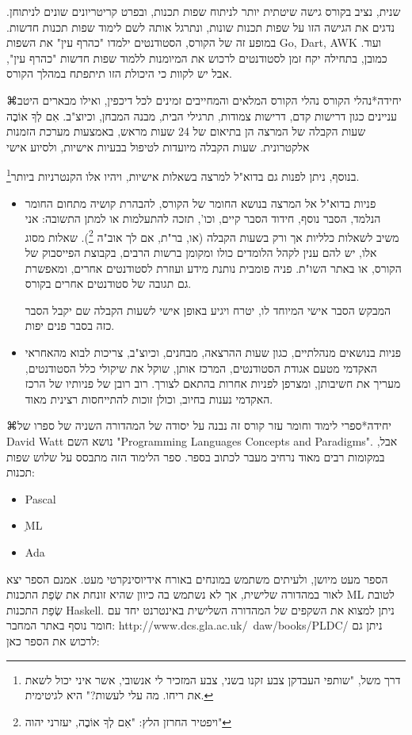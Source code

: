 שנית, נציב בקורס גישה שיטתית יותר לניתוח שפות תכנות, ובפרט קריטריונים שונים
לניתוחן. נדגים את הגישה הזו על שפות תכנות שונות, ונתרגל אותה לשם לימוד שפות
תכנות חדשות. במופע זה של הקורס, הסטודנטים ילמדו "כהרף עין" את השפות Go, Dart,
AWK ועוד. כמובן, בתחילה יקח זמן לסטודנטים לרכוש את המיומנות ללמוד שפות חדשות
"כהרף עין", אבל יש לקוות כי היכולת הזו תיתפתח במהלך הקורס. 


⌘יחידה*{נהלי הקורס} 
      נהלי הקורס המלאים והמחייבים זמינים לכל דיכפין, ואילו מבארים היטב עניינים כגון דרישות קדם, דרישות צמודות, תרגילי הבית, מבנה המבחן, וכיוצ"ב.
      אִם לְךָ אוֹבֶה
      שעות הקבלה של המרצה הן בתיאום של 24 שעות מראש, באמצעות מערכת הזמנות אלקטרונית. שעות הקבלה מיועדות לטיפול בבעיות אישיות, ולסיוע אישי

      בנוסף, ניתן לפנות גם בדוא"ל למרצה בשאלות אישיות, ויהיו אלו הקנטרניות ביותר\footnote{דרך משל,  "שותפי העבדקן צבע זקנו בשני, צבע המזכיר לי אנשובי, אשר איני יכול לשאת את ריחו. מה עלי לעשות?" היא לגיטימית.}.
      \begin{itemize}

     \item 
      פניות בדוא"ל אל המרצה בנושא החומר של הקורס, להבהרת קושיה מתחום החומר הנלמד, הסבר נוסף, חידוד הסבר קיים, וכו', תזכה להתעלמות או למתן התשובה: אני משיב לשאלות כלליות אך ורק בשעות הקבלה (או, בר"ת, אם לך אוב"ה \footnote{ ויפטיר החרזן הלץ: "אִם לְךָ אוֹבֶה, יעזרני יהוה"}). שאלות מסוג אלו, יש להם ענין לקהל הלומדים כולו ומקומן ברשות הרבים,  בקבוצת הפייסבוק של הקורס, או באתר השו"ת.  פניה פומבית נותנת מידע ועוזרת לסטודנטים אחרים, ומאפשרת גם תגובה של סטודנטים אחרים בקורס. 
      
      המבקש הסבר אישי המיוחד לו, יטרח ויגיע באופן אישי לשעות הקבלה שם יקבל הסבר כזה בסבר פנים יפות.
    \item 
     פניות בנושאים מנהלתיים, כגון שעות ההרצאה, מבחנים, וכיוצ"ב, צריכות לבוא מהאחראי האקדמי מטעם אגודת הסטודנטים, המרכז אותן, שוקל את שיקולי כלל הסטודנטים, מעריך את חשיבותן, ומצרפן לפניות אחרות בהתאם לצורך. רוב רובן של פניותיו של הרכז האקדמי נענות בחיוב, וכולן זוכות להתייחסות רצינית מאוד.
\end{itemize}
⌘יחידה*{ספרי לימוד וחומר עזר}
      קורס זה נבנה על יסודה של המהדורה השניה של ספרו של David Watt נושא השם "Programming Languages Concepts and Paradigms". אבל, במקומות רבים מאוד נרחיב מעבר לכתוב בספר. ספר הלימוד הזה מתבסס על שלוש שפות תכנות:
      \begin{itemize}
      \item Pascal
      \item ֵML
      \item Ada
     \end{itemize} 
      הספר מעט מיושן, ולעיתים משתמש במונחים באורח אידיוסינקרטי מעט. אמנם הספר יצא לאור במהדורה שלישית, אך לא נשתמש בה כיוון שהיא זונחת את שְׂפַת התכנות ML לטובת שְׂפַת התכנות Haskell.
      ניתן למצוא את השקפים של המהדורה השלישית באינטרנט יחד עם חומר נוסף באתר המחבר:
      http://www.dcs.gla.ac.uk/~daw/books/PLDC/
      ניתן גם לרכוש את הספר כאן:

